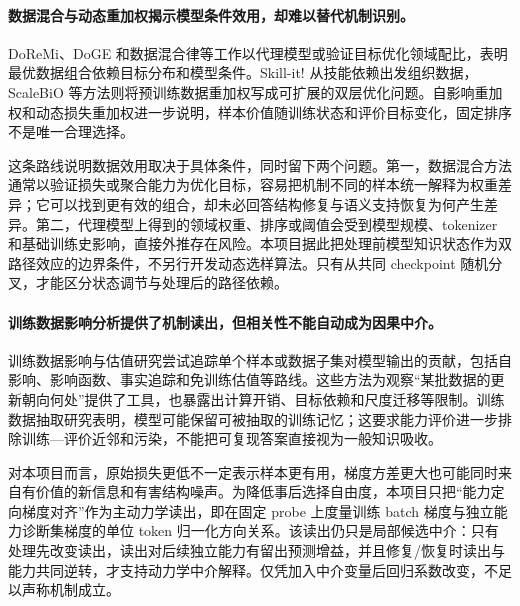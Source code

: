 \paragraph{数据混合与动态重加权揭示模型条件效用，却难以替代机制识别。}

DoReMi、DoGE 和数据混合律等工作以代理模型或验证目标优化领域配比，表明最优数据组合依赖目标分布和模型条件\cite{doremioptimizingdata2023,dogedomainreweighting2023,datamixinglaws2024}。Skill-it! 从技能依赖出发组织数据，ScaleBiO 等方法则将预训练数据重加权写成可扩展的双层优化问题\cite{skillita2023,scalebioscalablebilevel2024}。自影响重加权和动态损失重加权进一步说明，样本价值随训练状态和评价目标变化，固定排序不是唯一合理选择\cite{selfinfluenceguided2023,dynamiclossbased2025}。

这条路线说明数据效用取决于具体条件，同时留下两个问题。第一，数据混合方法通常以验证损失或聚合能力为优化目标，容易把机制不同的样本统一解释为权重差异；它可以找到更有效的组合，却未必回答结构修复与语义支持恢复为何产生差异。第二，代理模型上得到的领域权重、排序或阈值会受到模型规模、tokenizer 和基础训练史影响，直接外推存在风险。本项目据此把处理前模型知识状态作为双路径效应的边界条件，不另行开发动态选样算法。只有从共同 checkpoint 随机分叉，才能区分状态调节与处理后的路径依赖。

\paragraph{训练数据影响分析提供了机制读出，但相关性不能自动成为因果中介。}

训练数据影响与估值研究尝试追踪单个样本或数据子集对模型输出的贡献，包括自影响、影响函数、事实追踪和免训练估值等路线\cite{trainingdatainfluence2024,whatisyour2025,scalableinfluenceand2024,datavaluationwithout2023,opendatavalaunified2023}。这些方法为观察“某批数据的更新朝向何处”提供了工具，也暴露出计算开销、目标依赖和尺度迁移等限制。训练数据抽取研究表明，模型可能保留可被抽取的训练记忆；这要求能力评价进一步排除训练—评价近邻和污染，不能把可复现答案直接视为一般知识吸收\cite{extractingtrainingdata2020,scalableextractionof2023}。

对本项目而言，原始损失更低不一定表示样本更有用，梯度方差更大也可能同时来自有价值的新信息和有害结构噪声。为降低事后选择自由度，本项目只把“能力定向梯度对齐”作为主动力学读出，即在固定 probe 上度量训练 batch 梯度与独立能力诊断集梯度的单位 token 归一化方向关系。该读出仍只是局部候选中介：只有处理先改变读出，读出对后续独立能力有留出预测增益，并且修复/恢复时读出与能力共同逆转，才支持动力学中介解释。仅凭加入中介变量后回归系数改变，不足以声称机制成立。

